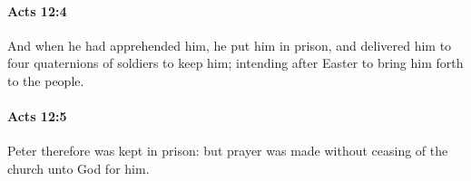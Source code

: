 		\paragraph{Acts 12:4} %
			\label{ACTS-12-4}

			And when he had apprehended him, he put him in prison, and delivered him to four quaternions of soldiers to keep him; intending after Easter to bring him forth to the people.

			\begin{framed}
			\scriptsize
				\begin{compactdesc}
					\item[SBLG] 
				\end{compactdesc}
			\end{framed}

		\paragraph{Acts 12:5} %
			\label{ACTS-12-5}

			Peter therefore was kept in prison: but prayer was made without ceasing of the church unto God for him.

